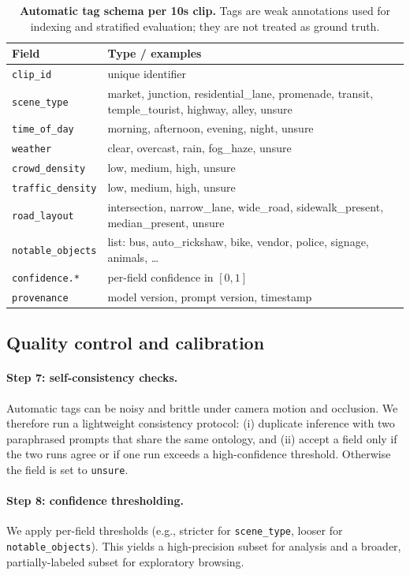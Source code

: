 \begin{table}[t]
\centering
\small
\setlength{\tabcolsep}{6pt}
\renewcommand{\arraystretch}{1.15}
\caption{\textbf{Automatic tag schema per 10s clip.} Tags are weak annotations used for indexing and stratified evaluation; they are not treated as ground truth.}
\label{tab:auto_tag_schema}
\begin{tabular}{l l}
\hline
\textbf{Field} & \textbf{Type / examples} \\
\hline
\texttt{clip\_id} & unique identifier \\
\texttt{scene\_type} & market, junction, residential\_lane, promenade, transit, temple\_tourist, highway, alley, unsure \\
\texttt{time\_of\_day} & morning, afternoon, evening, night, unsure \\
\texttt{weather} & clear, overcast, rain, fog\_haze, unsure \\
\texttt{crowd\_density} & low, medium, high, unsure \\
\texttt{traffic\_density} & low, medium, high, unsure \\
\texttt{road\_layout} & intersection, narrow\_lane, wide\_road, sidewalk\_present, median\_present, unsure \\
\texttt{notable\_objects} & list: bus, auto\_rickshaw, bike, vendor, police, signage, animals, \dots \\
\texttt{confidence.*} & per-field confidence in $[0,1]$ \\
\texttt{provenance} & model version, prompt version, timestamp \\
\hline
\end{tabular}
\end{table}

\subsection{Quality control and calibration}\label{sec:tag_qc}
\paragraph{Step 7: self-consistency checks.} Automatic tags can be noisy and brittle under camera motion and occlusion. We therefore run a lightweight consistency protocol: (i) duplicate inference with two paraphrased prompts that share the same ontology, and (ii) accept a field only if the two runs agree or if one run exceeds a high-confidence threshold. Otherwise the field is set to \texttt{unsure}.
\paragraph{Step 8: confidence thresholding.} We apply per-field thresholds (e.g., stricter for \texttt{scene\_type}, looser for \texttt{notable\_objects}). This yields a high-precision subset for analysis and a broader, partially-labeled subset for exploratory browsing.
